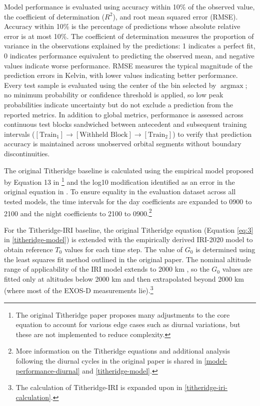 \documentclass{agujournal2019}
\begin{document}
Model performance is evaluated using accuracy within 10\% of the observed value, the coefficient of determination ($R^2$), and root mean squared error (RMSE). Accuracy within 10\% is the percentage of predictions whose absolute relative error is at most 10\%. The coefficient of determination measures the proportion of variance in the observations explained by the predictions: 1 indicates a perfect fit, 0 indicates performance equivalent to predicting the observed mean, and negative values indicate worse performance. RMSE measures the typical magnitude of the prediction errors in Kelvin, with lower values indicating better performance. Every test sample is evaluated using the center of the bin selected by $\operatorname{argmax}$; no minimum probability or confidence threshold is applied, so low peak probabilities indicate uncertainty but do not exclude a prediction from the reported metrics. In addition to global metrics, performance is assessed across continuous test blocks sandwiched between antecedent and subsequent training intervals ($[\text{Train}_1] \to [\text{Withheld Block}] \to [\text{Train}_2]$) to verify that prediction accuracy is maintained across unobserved orbital segments without boundary discontinuities.

The original Titheridge baseline is calculated using the empirical model proposed by Equation 13 in \cite{titheridge_temperatures_1998}\footnote{The original Titheridge paper proposes many adjustments to the core equation to account for various edge cases such as diurnal variations, but these are not implemented to reduce complexity.} and the log10 modification identified as an error in the original equation in \cite{webb_modifications_2003}. To ensure equality in the evaluation dataset across all tested models, the time intervals for the day coefficients are expanded to 0900 to 2100 and the night coefficients to 2100 to 0900.\footnote{More information on the Titheridge equations and additional analysis following the diurnal cycles in the original paper is shared in \ref{model-performance-diurnal} and \ref{titheridge-model}.}

For the Titheridge-IRI baseline, the original Titheridge equation (Equation \ref{eq:3} in \ref{titheridge-model}) is extended with the empirically derived IRI-2020 model \citep{bilitza_international_2022} to obtain reference $T_0$ values for each time step. The value of $G_0$ is determined using the least squares fit method outlined in the original paper. The nominal altitude range of applicability of the IRI model extends to 2000 km \citep{bilitza_international_2022}, so the $G_0$ values are fitted only at altitudes below 2000 km and then extrapolated beyond 2000 km (where most of the EXOS-D measurements lie).\footnote{The calculation of Titheridge-IRI is expanded upon in \ref{titheridge-iri-calculation}.}
\end{document}
